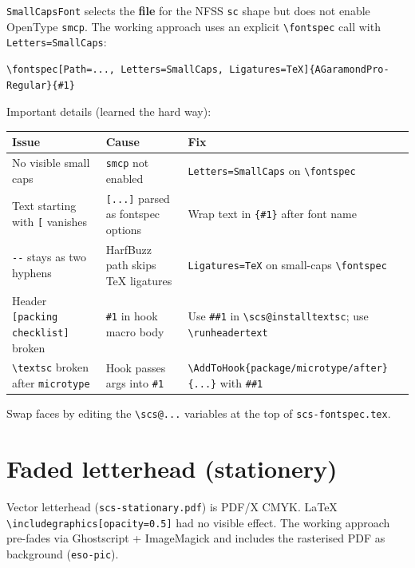 \documentclass[11pt]{article}
\begin{document}
\texttt{SmallCapsFont} selects the \textbf{file} for the NFSS \texttt{sc} shape but does not
enable OpenType \texttt{smcp}.  The working approach uses an explicit \texttt{\textbackslash{}fontspec}
call with \texttt{Letters=SmallCaps}:

\begin{verbatim}
\fontspec[Path=..., Letters=SmallCaps, Ligatures=TeX]{AGaramondPro-Regular}{#1}
\end{verbatim}

Important details (learned the hard way):

\begin{center}
\begin{tabular}{lll}
Issue & Cause & Fix\\
\hline
No visible small caps & \texttt{smcp} not enabled & \texttt{Letters=SmallCaps} on \texttt{\textbackslash{}fontspec}\\
Text starting with \texttt{[} vanishes & \texttt{[...]} parsed as fontspec options & Wrap text in \texttt{\{\#1\}} after font name\\
\texttt{-{}-{}} stays as two hyphens & HarfBuzz path skips \TeX{} ligatures & \texttt{Ligatures=TeX} on small-caps \texttt{\textbackslash{}fontspec}\\
Header \texttt{[packing checklist]} broken & \texttt{\#1} in hook macro body & Use \texttt{\#\#1} in \texttt{\textbackslash{}scs@installtextsc}; use \texttt{\textbackslash{}runheadertext}\\
\texttt{\textbackslash{}textsc} broken after \texttt{microtype} & Hook passes args into \texttt{\#1} & \texttt{\textbackslash{}AddToHook\{package/microtype/after\}\{...\}} with \texttt{\#\#1}\\
\end{tabular}
\end{center}

Swap faces by editing the \texttt{\textbackslash{}scs@...} variables at the top of
\texttt{scs-fontspec.tex}.
\section*{Faded letterhead (stationery)}
\label{sec:orgabc7856}

Vector letterhead (\texttt{scs-stationary.pdf}) is PDF/X CMYK.  \LaTeX{}
\texttt{\textbackslash{}includegraphics[opacity=0.5]} had no visible effect.  The working approach
pre-fades via Ghostscript + ImageMagick and includes the rasterised PDF as
background (\texttt{eso-pic}).
\end{document}
